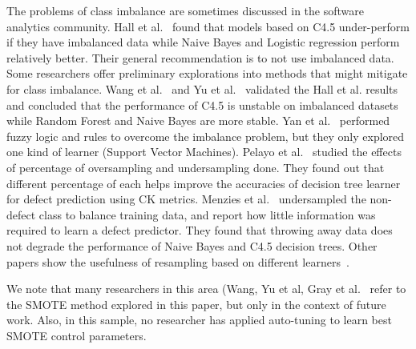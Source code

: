 \documentclass[10pt,conference]{IEEEtran}
\theoremstyle{break}
\theoremstyle{break}
\newcommand{\sma}{{\sc SMOTE}}
\begin{document}
The problems of class imbalance are sometimes discussed in the software analytics community.
Hall et al.~\cite{hall2012systematic} found that models based on C4.5 under-perform if they have imbalanced data while Naive Bayes and Logistic regression perform relatively better. 
Their general recommendation is to not use
imbalanced data.  
Some researchers offer preliminary explorations into methods that might mitigate for class imbalance.
Wang et al.~\cite{wang2013using} and Yu et al.~\cite{yuperformance} validated the Hall et al. results and concluded that the
performance of C4.5 is unstable on imbalanced datasets while  Random Forest and Naive Bayes are 
more stable. 
Yan et al.~\cite{yan2010software} performed fuzzy logic and rules to overcome the imbalance problem, but they only
explored one kind of learner (Support Vector Machines).
Pelayo et al.~\cite{pelayo2007applying} studied the effects of percentage of oversampling and undersampling done. They found out that different percentage of each helps improve the accuracies of decision tree learner for defect prediction using CK metrics. Menzies et al.~\cite{menzies2008implications} undersampled the non-defect class to balance training
data, and report how little information was required to learn a defect predictor. They found that throwing away data does not degrade the performance of Naive Bayes and C4.5 decision trees. Other papers show the usefulness of resampling based on different learners~\cite{pelayo2007applying, pelayo2012evaluating, riquelme2008finding}.

We note that  
many researchers in this area  (Wang, Yu et al, Gray et al.~\cite{gray2009using,yuperformance,wang2013using} refer to the {\sma} method explored in this paper,  but only in the context of future work. 
Also, 
in this sample, no researcher has  applied auto-tuning to learn best {\sma} control parameters. 
\end{document}
